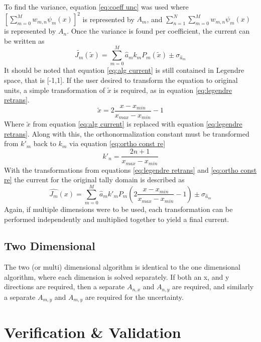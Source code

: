 \documentclass[10tma4paper]{article}
\begin{document}
To find the variance, equation \eqref{eq:coeff unc} was used where $[\sum_{m=0}^{M}w_{m,n}\psi_{m}(x)]^{2}$ is represented by $A_{m}$, and $\sum_{n=1}^{N}\sum_{m=0}^{M}w_{m,n}\psi_{m}(x)$ is represented by $A_{n}$. Once the variance is found per coefficient, the current can be written as
\begin{equation}\label{eq:alg current}
	\tilde{J_{m}}(\tilde{x}) = \sum_{m=0}^{M}\hat{a}_{m}k_{m}P_{m}(\tilde{x}) \pm  \sigma_{\hat{a}_{m}}
\end{equation}
It should be noted that equation \eqref{eq:alg current} is still contained in Legendre space, that is [-1,1]. If the user desired to transform the equation to original units, a simple transformation of $\tilde{x}$ is required, as in equation \eqref{eq:legendre retrans}.
\begin{equation}\label{eq:legendre retrans}
\tilde{x} = 2\frac{x-x_{min}}{x_{max}-x_{min}}-1
\end{equation}
Where $\tilde{x}$ from equation \eqref{eq:alg current} is replaced with equation \eqref{eq:legendre retrans}. Along with this, the orthonormalization constant must be transformed from $k'_{m}$ back to $k_{m}$ via equation \eqref{eq:ortho const re}
\begin{equation}\label{eq:ortho const re}
k'_{n} = \frac{2n+1}{x_{max}-x_{min}}
\end{equation}
With the transformations from equations \eqref{eq:legendre retrans} and \eqref{eq:ortho const re} the current for the original tally domain is described as 
\begin{equation}\label{eq:final current}
	\hat{J_{m}}(x) = \sum_{m=0}^{M}\hat{a}_{m}k'_{m}P_{m}(2\frac{x-x_{min}}{x_{max}-x_{min}}-1) \pm  \sigma_{\hat{a}_{m}}
\end{equation}
Again, if multiple dimensions were to be used, each transformation can be performed independently and multiplied together to yield a final current. 

\subsection{Two Dimensional}\label{alg twod}
The two (or multi) dimensional algorithm is identical to the one dimensional algorithm, where each dimension is solved separately. If both an x, and y directions are required, then a separate $A_{n,x}$ and $A_{n,y}$ are required, and similarly a separate $A_{m,y}$ and $A_{m,y}$ are required for the uncertainty.

\section{Verification \& Validation}\label{vv}
\end{document}
